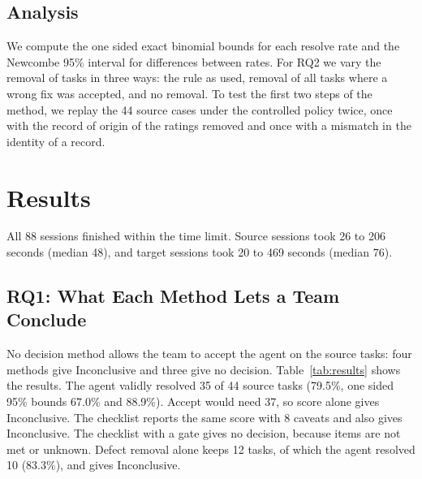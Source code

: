 \documentclass[runningheads]{llncs}
\begin{document}
\subsection{Analysis}
We compute the one sided exact binomial bounds for each resolve rate and the Newcombe 95\% interval for differences between rates. For RQ2 we vary the removal of tasks in three ways: the rule as used, removal of all tasks where a wrong fix was accepted, and no removal. To test the first two steps of the method, we replay the 44 source cases under the controlled policy twice, once with the record of origin of the ratings removed and once with a mismatch in the identity of a record.

\section{Results}
\label{sec:results}
All 88 sessions finished within the time limit. Source sessions took 26 to 206 seconds (median 48), and target sessions took 20 to 469 seconds (median 76).

\subsection{RQ1: What Each Method Lets a Team Conclude}
No decision method allows the team to accept the agent on the source tasks: four methods give Inconclusive and three give no decision. Table~\ref{tab:results} shows the results. The agent validly resolved 35 of 44 source tasks (79.5\%, one sided 95\% bounds 67.0\% and 88.9\%). Accept would need 37, so score alone gives Inconclusive. The checklist reports the same score with 8 caveats and also gives Inconclusive. The checklist with a gate gives no decision, because items are not met or unknown. Defect removal alone keeps 12 tasks, of which the agent resolved 10 (83.3\%), and gives Inconclusive.
\end{document}
